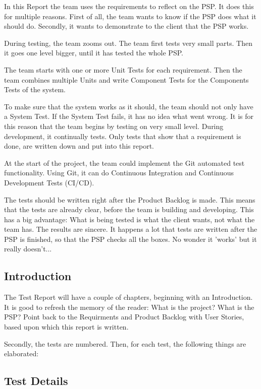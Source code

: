 \documentclass[10pt]{report}
\begin{document}
In this Report the team uses the requirements to reflect on the PSP. It does this for multiple reasons. First of all, the team wants to know if the PSP does what it should do. Secondly, it wants to demonstrate to the client that the PSP works. 

During testing, the team zooms out. The team first tests very small parts. Then it goes one level bigger, until it has tested the whole PSP.

The team starts with one or more Unit Tests for each requirement. Then the team combines multiple Units and write Component Tests for the Components Tests of the system. 

\bigskip

To make sure that the system works as it should, the team should not only have a System Test. If the System Test fails, it has no idea what went wrong. It is for this reason that the team begins by testing on very small level. During development, it continually tests. Only tests that show that a requirement is done, are written down and put into this report.

At the start of the project, the team could implement the Git automated test functionality. Using Git, it can do Continuous Integration and Continuous Development Tests (CI/CD).

\bigskip

The tests should be written right after the Product Backlog is made. This means that the tests are already clear, before the team is building and developing. This has a big advantage: What is being tested is what the client wants, not what the team has. The results are sincere. It happens a lot that tests are written after the PSP is finished, so that the PSP checks all the boxes. No wonder it 'works' but it really doesn't...

\subsection{Introduction}

The Test Report will have a couple of chapters, beginning with an Introduction. It is good to refresh the memory of the reader: What is the project? What is the PSP? Point back to the Requirments and Product Backlog with User Stories, based upon which this report is written.

Secondly, the tests are numbered. Then, for each test, the following things are elaborated:

\subsection{Test Details}
\end{document}
